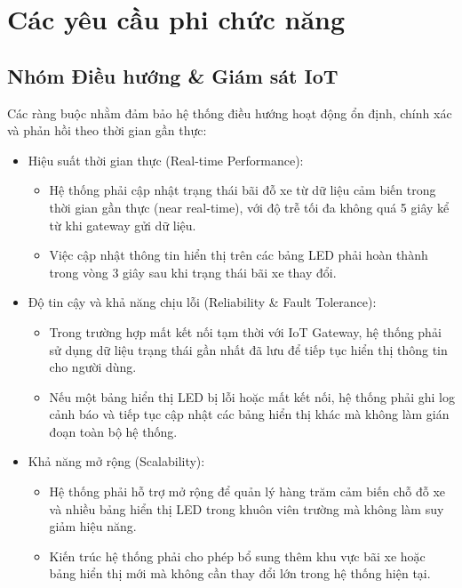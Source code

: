 \newpage
\section{Các yêu cầu phi chức năng}

\subsection{Nhóm Điều hướng \& Giám sát IoT}
Các ràng buộc nhằm đảm bảo hệ thống điều hướng hoạt động ổn định, chính xác và phản hồi theo thời gian gần thực:
\begin{itemize}
    \item Hiệu suất thời gian thực (Real-time Performance):
    \begin{itemize}
        \item Hệ thống phải cập nhật trạng thái bãi đỗ xe từ dữ liệu cảm biến trong thời gian gần thực (near real-time), với độ trễ tối đa không quá 5 giây kể từ khi gateway gửi dữ liệu.
        \item Việc cập nhật thông tin hiển thị trên các bảng LED phải hoàn thành trong vòng 3 giây sau khi trạng thái bãi xe thay đổi.
    \end{itemize}

    \item Độ tin cậy và khả năng chịu lỗi (Reliability \& Fault Tolerance):
    \begin{itemize}
        \item Trong trường hợp mất kết nối tạm thời với IoT Gateway, hệ thống phải sử dụng dữ liệu trạng thái gần nhất đã lưu để tiếp tục hiển thị thông tin cho người dùng.
        \item Nếu một bảng hiển thị LED bị lỗi hoặc mất kết nối, hệ thống phải ghi log cảnh báo và tiếp tục cập nhật các bảng hiển thị khác mà không làm gián đoạn toàn bộ hệ thống.
    \end{itemize}

    \item Khả năng mở rộng (Scalability):
    \begin{itemize}
        \item Hệ thống phải hỗ trợ mở rộng để quản lý hàng trăm cảm biến chỗ đỗ xe và nhiều bảng hiển thị LED trong khuôn viên trường mà không làm suy giảm hiệu năng.
        \item Kiến trúc hệ thống phải cho phép bổ sung thêm khu vực bãi xe hoặc bảng hiển thị mới mà không cần thay đổi lớn trong hệ thống hiện tại.
    \end{itemize}


\end{itemize}
